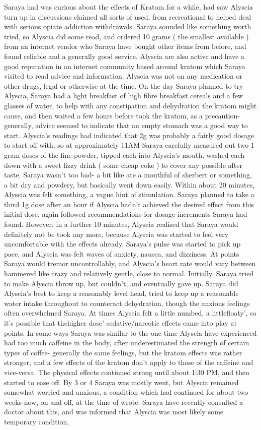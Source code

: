 \documentclass[12pt]{book}
\begin{document}
Saraya had was curious about the effects of Kratom for a while, had saw Alyscia turn up in discussions claimed all sorts of used, from recreational to helped deal with serious opiate addiction withdrawals. Saraya sounded like something worth tried, so Alyscia did some read, and ordered 10 grams ( the smallest available ) from an internet vendor who Saraya have bought other items from before, and found reliable and a generally good service. Alyscia are also active and have a good reputation in an internet community based around kratom which Saraya visited to read advice and information. Alyscia was not on any medication or other drugs, legal or otherwise at the time. On the day Saraya planned to try Alyscia, Saraya had a light breakfast of high fibre breakfast cereals and a few glasses of water, to help with any constipation and dehydration the kratom might cause, and then waited a few hours before took the kratom, as a precaution- generally, advice seemed to indicate that an empty stomach was a good way to start. Alyscia's readings had indicated that 2g was probably a fairly good dosage to start off with, so at approximately 11AM Saraya carefully measured out two 1 gram doses of the fine powder, tipped each into Alyscia's mouth, washed each down with a sweet fizzy drink ( some cheap coke ) to cover any possible after taste. Saraya wasn't too bad- a bit like ate a mouthful of sherbert or something, a bit dry and powdery, but basically went down easily. Within about 20 minutes, Alyscia was felt something, a vague hint of stimulation. Saraya planned to take a third 1g dose after an hour if Alyscia hadn't achieved the desired effect from this initial dose, again followed recommendations for dosage increments Saraya had found. However, in a further 10 minutes, Alyscia realised that Saraya would definitely not be took any more, because Alyscia was started to feel very uncomfortable with the effects already. Saraya's pulse was started to pick up pace, and Alyscia was felt waves of anxiety, nausea, and dizziness. At points Saraya would tremor uncontrollably, and Alyscia's heart rate would vary between hammered like crazy and relatively gentle, close to normal. Initially, Saraya tried to make Alyscia throw up, but couldn't, and eventually gave up. Saraya did Alyscia's best to keep a reasonably level head, tried to keep up a reasonable water intake throughout to counteract dehydration, though the anxious feelings often overwhelmed Saraya. At times Alyscia felt a little numbed, a littlefloaty', so it's possible that thehigher dose' sedative/narcotic effects came into play at points. In some ways Saraya was similar to the one time Alyscia have experienced had too much caffeine in the body, after underestimated the strength of certain types of coffee- generally the same feelings, but the kratom effects was rather stronger, and a few effects of the kratom don't apply to those of the caffeine and vice-versa. The physical effects continued strong until about 1:30 PM, and then started to ease off. By 3 or 4 Saraya was mostly went, but Alyscia remained somewhat worried and anxious, a condition which had continued for about two weeks now, on and off, at the time of wrote. Saraya have recently consulted a doctor about this, and was informed that Alyscia was most likely some temporary condition, 
\end{document}
